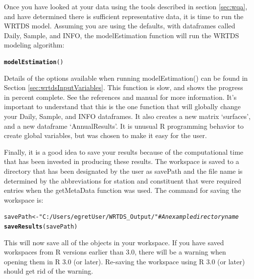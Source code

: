 \documentclass[a4paper,11pt]{article}\usepackage[]{graphicx}\usepackage[]{color}
\makeatletter
\newcommand{\hlstr}[1]{\textcolor[rgb]{0.192,0.494,0.8}{#1}}%
\newcommand{\hlcom}[1]{\textcolor[rgb]{0.678,0.584,0.686}{\textit{#1}}}%
\newcommand{\hlstd}[1]{\textcolor[rgb]{0.345,0.345,0.345}{#1}}%
\newcommand{\hlkwb}[1]{\textcolor[rgb]{0.69,0.353,0.396}{#1}}%
\newcommand{\hlkwd}[1]{\textcolor[rgb]{0.737,0.353,0.396}{\textbf{#1}}}%
\newenvironment{kframe}{%
 \def\at@end@of@kframe{}%
 \ifinner\ifhmode%
  \def\at@end@of@kframe{\end{minipage}}%
  \begin{minipage}{\columnwidth}%
 \fi\fi%
 \def\FrameCommand##1{\hskip\@totalleftmargin \hskip-\fboxsep
 \colorbox{shadecolor}{##1}\hskip-\fboxsep
     \hskip-\linewidth \hskip-\@totalleftmargin \hskip\columnwidth}%
 \MakeFramed {\advance\hsize-\width
   \@totalleftmargin\z@ \linewidth\hsize
   \@setminipage}}%
 {\par\unskip\endMakeFramed%
 \at@end@of@kframe}
\newenvironment{knitrout}{}{} %
\makeatother
\begin{document}
Once you have looked at your data using the tools described in section \ref{sec:wqa}, and have determined there is sufficient representative data, it is time to run the WRTDS model. Assuming you are using the defaults, with dataframes called Daily, Sample, and INFO, the modelEstimation function will run the WRTDS modeling algorithm:

\begin{knitrout}
\color{fgcolor}\begin{kframe}
\begin{alltt}
\hlkwd{modelEstimation}\hlstd{()}
\end{alltt}
\end{kframe}
\end{knitrout}

Details of the options available when running modelEstimation() can be found in Section \ref{sec:wrtdsInputVariables}. This function is slow, and shows the progress in percent complete. See the references and manual for more information. It's important to understand that this is the one function that will globally change your Daily, Sample, and INFO dataframes. It also creates a new matrix `surfaces', and a new dataframe `AnnualResults'. It is unusual R programming behavior to create global variables, but was chosen to make it easy for the user.

Finally, it is a good idea to save your results because of the computational time that has been invested in producing these results. The workspace is saved to a directory that has been designated by the user as savePath and the file name is determined by the abbreviations for station and constituent that were required entries when the getMetaData function was used. The command for saving the workspace is:

\begin{knitrout}
\color{fgcolor}\begin{kframe}
\begin{alltt}
\hlstd{savePath} \hlkwb{<-} \hlstr{"C:/Users/egretUser/WRTDS_Output/"} \hlcom{#An example directory name}
\hlkwd{saveResults}\hlstd{(savePath)}
\end{alltt}
\end{kframe}
\end{knitrout}

This will now save all of the objects in your workspace. If you have saved workspaces from R versions earlier than 3.0, there will be a warning when opening them in R 3.0 (or later). Re-saving the workspace using R 3.0 (or later) should get rid of the warning.
\end{document}
